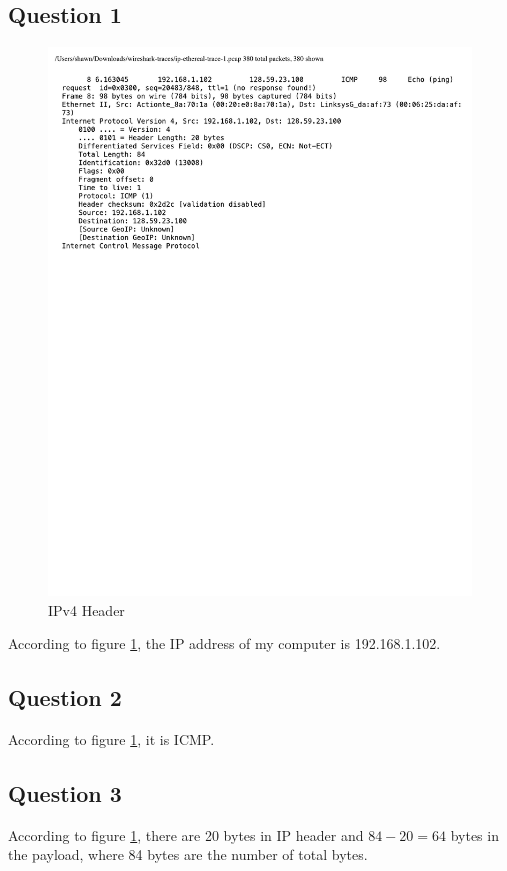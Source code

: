 \documentclass[titlepage, paper=a4, fontsize=11pt]{scrartcl} %
\numberwithin{equation}{section} %
\numberwithin{figure}{section} %
\numberwithin{table}{section} %
\begin{document}
\subsection*{Question 1}
\begin{figure}[!ht]
    \centering
    \includegraphics[width=\textwidth]{images/lab2-q1.pdf}
    \caption{IPv4 Header}
    \label{fig:ip-header}
\end{figure}
According to figure \ref{fig:ip-header}, the IP address of my computer is 192.168.1.102. \\

\subsection*{Question 2}
According to figure \ref{fig:ip-header}, it is ICMP. \\

\subsection*{Question 3}
According to figure \ref{fig:ip-header}, there are 20 bytes in IP header and $84-20=64$ bytes in the payload, where 84 bytes are the number of total bytes. \\
\end{document}
